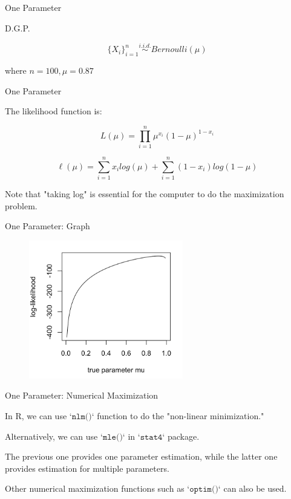 \documentclass[12pt]{beamer}
\begin{document}
\begin{frame}[fragile]{One Parameter}

D.G.P.

$$\{X_i\}_{i=1}^n \stackrel{i.i.d.}{\sim} Bernoulli(\mu)$$

where $n=100, \mu=0.87$


\end{frame}


\begin{frame}[fragile]{One Parameter}

The likelihood function is:

$$L(\mu) = \prod_{i=1}^n \mu^{x_i} (1-\mu)^{1-x_i}$$

$$\ell(\mu) = \sum_{i=1}^n x_i log(\mu) + \sum_{i=1}^n ({1-x_i}) log(1-\mu)$$

Note that "taking log" is essential for the computer to do the maximization problem.

\end{frame}


\begin{frame}[fragile]{One Parameter: Graph}

	\begin{figure}
		\begin{center}
			\includegraphics[width=0.6\textwidth]{figure/f01.png}
		\end{center}
	\end{figure}

\end{frame}


\begin{frame}[fragile]{One Parameter: Numerical Maximization}

In R, we can use $\texttt{`nlm()`}$ function to do the "non-linear minimization."

Alternatively, we can use $\texttt{`mle()`}$ in $\texttt{`stat4`}$ package.

The previous one provides one parameter estimation, while the latter one provides estimation for multiple parameters.

Other numerical maximization functions such as $\texttt{`optim()`}$ can also be used.

\end{frame}
\end{document}
